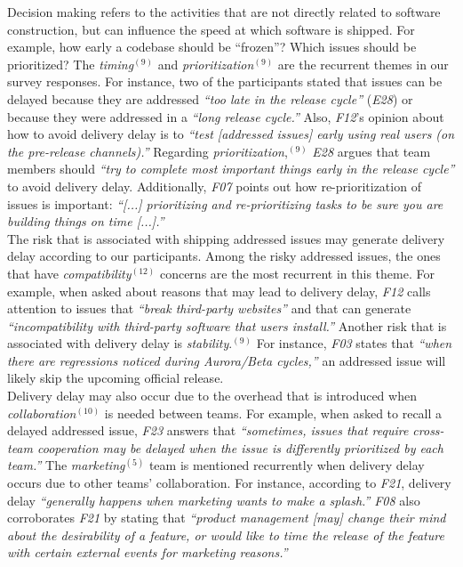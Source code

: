 \begin{sloppypar}
\noindent{} Decision making refers to the
activities that are not directly related to software construction, but can
influence the speed at which software is shipped. For example, how early a
codebase should be ``frozen''? Which issues should be prioritized? The {\em
timing}$^{(9)}$ and {\em prioritization}$^{(9)}$ are the recurrent themes in
our survey responses. For instance, two of the participants stated that issues
can be delayed because they are addressed {\em ``too late in the release
cycle''} ({\em E28}) or because they were addressed in a {\em ``long release
cycle.''} Also, {\em F12}'s opinion about how to avoid delivery delay is to
{\em ``test [addressed issues] early using real users (\eg on the pre-release
channels).''} Regarding {\em prioritization},$^{(9)}$ {\em E28} argues that team
members should {\em ``try to complete most important things early in the release
cycle''} to avoid delivery delay. Additionally, {\em F07} points out how
re-prioritization of issues is important: {\em ``[...] prioritizing and
re-prioritizing tasks to be sure you are building things on time [...].''}\\

\noindent{} The risk that is associated with shipping
addressed issues may generate delivery delay according to our participants.
Among the risky addressed issues, the ones that have {\em
compatibility}$^{(12)}$ concerns are the most recurrent in this theme. For
example, when asked about reasons that may lead to delivery delay, {\em F12}
calls attention to issues that {\em ``break third-party websites''} and that can
generate {\em ``incompatibility with third-party software that users install.''}
Another risk that is associated with delivery delay is {\em stability}.$^{(9)}$
For instance, {\em F03} states that {\em ``when there are regressions noticed
during Aurora/Beta cycles,''} an addressed issue will likely skip the upcoming
official release.\\

\noindent{}
Delivery delay may also occur due to
the overhead that is introduced when {\em collaboration}$^{(10)}$ is needed
between teams. For example, when asked to recall a delayed addressed
issue, {\em F23} answers that {\em ``sometimes, issues that require cross-team
cooperation may be delayed when the issue is differently prioritized by each
team.''} The {\em marketing}$^{(5)}$ team is mentioned recurrently when
delivery delay occurs due to other teams' collaboration. For instance,
according to {\em F21}, delivery delay {\em ``generally happens when
marketing wants to make a splash.''} {\em F08} also corroborates  {\em F21} by
stating that {\em ``product management [may] change their mind about the
desirability of a feature, or would like to time the release of the feature with
certain external events for marketing reasons.''}\\


\end{sloppypar}
